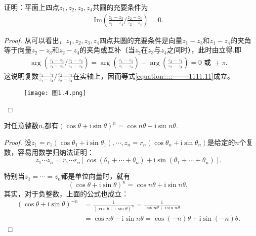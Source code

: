 \documentclass[../../main.tex]{subfiles}
\begin{document}
\begin{example}
证明：平面上四点\(z_1, z_2, z_3, z_4\)共圆的充要条件为
\begin{align}\label{equation:::::-------1111.11}
\mathrm{Im}\left( \frac{z_1 - z_3}{z_1 - z_4} \bigg/ \frac{z_2 - z_3}{z_2 - z_4} \right) = 0.
\end{align}
\end{example}
\begin{proof}
从可以看出，\(z_1, z_2, z_3, z_4\)四点共圆的充要条件是向量\(z_1 - z_3\)和\(z_1 - z_4\)的夹角等于向量\(z_2 - z_3\)和\(z_2 - z_4\)的夹角或互补（当\(z_2\)在\(z_3\)与\(z_4\)之间时），此时由立得.即
\[
\begin{split}
\arg\left( \frac{z_1 - z_3}{z_1 - z_4} \bigg/ \frac{z_2 - z_3}{z_2 - z_4} \right) = \arg\left( \frac{z_1 - z_3}{z_1 - z_4} \right) - \arg\left( \frac{z_2 - z_3}{z_2 - z_4} \right) 
= 0 \text{ 或 } \pm \pi.
\end{split}
\]
这说明复数\(\frac{z_1 - z_3}{z_1 - z_4} \bigg/ \frac{z_2 - z_3}{z_2 - z_4}\)在实轴上，因而等式\eqref{equation:::::-------1111.11}成立。
\begin{figure}[H]
\centering
\texttt{[image: 图1.4.png]}
\caption{}
\label{figure:图1.4}
\end{figure} 

\end{proof}

\begin{theorem}[De Moivre公式]\label{theorem:De Moivre公式}
对任意整数$n$,都有$(\cos\theta + \mathrm{i}\sin\theta)^n = \cos n\theta + \mathrm{i}\sin n\theta.$
\end{theorem}
\begin{proof}
设\(z_1 = r_1(\cos\theta_1 + \mathrm{i}\sin\theta_1), \cdots, z_n = r_n(\cos\theta_n + \mathrm{i}\sin\theta_n)\)是给定的\(n\)个复数，容易用数学归纳法证明：
\[
z_1 \cdots z_n = r_1 \cdots r_n[\cos(\theta_1 + \cdots + \theta_n) + \mathrm{i}\sin(\theta_1 + \cdots + \theta_n)].
\]

特别当\(z_1 = \cdots = z_n\)都是单位向量时，就有
\[
(\cos\theta + \mathrm{i}\sin\theta)^n = \cos n\theta + \mathrm{i}\sin n\theta,
\]
其实，对于负整数，上面的公式也成立：
\[
\begin{split}
(\cos\theta + \mathrm{i}\sin\theta)^{-n} &= \frac{1}{(\cos\theta + \mathrm{i}\sin\theta)^n} = \frac{1}{\cos n\theta + \mathrm{i}\sin n\theta} \\
&= \cos n\theta - \mathrm{i}\sin n\theta = \cos(-n)\theta + \mathrm{i}\sin(-n)\theta.
\end{split}
\]

\end{proof}
\end{document}

